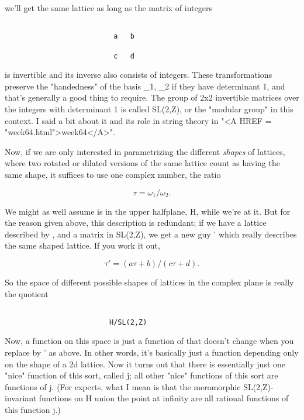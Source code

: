 we'll get the same lattice as long as the matrix of integers

\begin{verbatim}

                          a   b 

                          c   d
\end{verbatim}
    

is invertible and its inverse also consists of integers.
These transformations preserve the "handedness" of the
basis \omega _{1}, \omega _{2} 
if they have determinant 1, and that's generally
a good thing to require.  The group of 2x2 invertible matrices over the
integers with determinant 1 is called SL(2,Z), or the "modular group" in
this context.  I said a bit about it and its role in string theory in
"<A HREF = "week64.html">week64</A>".

Now, if we are only interested in parametrizing the different \emph{shapes}
of lattices, where two rotated or dilated versions of the same lattice
count as having the same shape, it suffices to use one complex number, the
ratio 

$$

                       \tau  = \omega _{1}/\omega _{2}.
$$
    
We might as well assume \tau  is in the upper 
halfplane, H, while we're at it.    But for the reason given above, this 
description is redundant; if we have a lattice described by \tau , and a 
matrix in SL(2,Z), we get a new guy \tau ' which really describes the 
same shaped lattice.  If you work it out, 

$$

                   \tau ' = (a \tau  + b)/(c \tau  + d).
$$
    
So the space of different possible shapes of lattices in the complex
plane is really the quotient 


\begin{verbatim}

                         H/SL(2,Z)
\end{verbatim}
    

Now, a function on this space is just a function of \tau  that doesn't
change when you replace \tau  by \tau ' as above.  In other words, it's
basically just a function depending only on the shape of a 2d lattice.
Now it turns out that there is essentially just one "nice" function of
this sort, called j; all other "nice" functions of this sort are
functions of j.  (For experts, what I mean is that the meromorphic
SL(2,Z)-invariant functions on H union the point at infinity are all
rational functions of this function j.)

